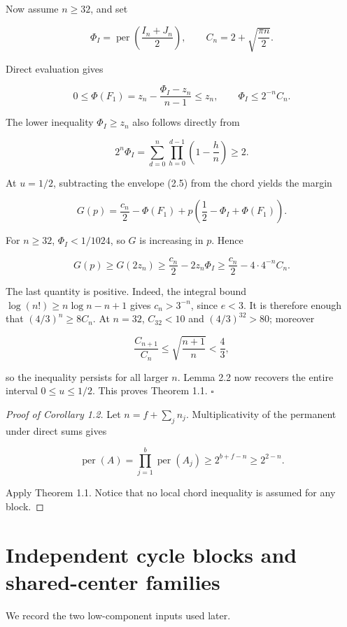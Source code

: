 \documentclass[11pt]{article}
\begin{document}
Now assume $n\ge32$, and set

\[
\Phi_I=\operatorname{per}\left(\frac{I_n+J_n}{2}\right),
\qquad C_n=2+\sqrt{\frac{\pi n}{2}}. \tag{3.1}
\]

Direct evaluation gives

\[
0\le\Phi(F_1)
=z_n-\frac{\Phi_I-z_n}{n-1}\le z_n,
\qquad \Phi_I\le2^{-n}C_n. \tag{3.2}
\]

The lower inequality $\Phi_I\ge z_n$ also follows directly from

\[
2^n\Phi_I=\sum_{d=0}^n\prod_{h=0}^{d-1}\left(1-\frac hn\right)\ge2. \tag{3.3}
\]

At $u=1/2$, subtracting the envelope (2.5) from the chord yields the margin

\[
G(p)=\frac{c_n}{2}-\Phi(F_1)
+p\left(\frac12-\Phi_I+\Phi(F_1)\right). \tag{3.4}
\]

For $n\ge32$, $\Phi_I<1/1024$, so $G$ is increasing in $p$.  Hence

\[
G(p)\ge G(2z_n)
\ge\frac{c_n}{2}-2z_n\Phi_I
\ge\frac{c_n}{2}-4\cdot4^{-n}C_n. \tag{3.5}
\]

The last quantity is positive.  Indeed, the integral bound
$\log(n!)\ge n\log n-n+1$ gives $c_n>3^{-n}$, since $e<3$.  It is therefore
enough that $(4/3)^n\ge8C_n$.  At $n=32$, $C_{32}<10$ and
$(4/3)^{32}>80$; moreover

\[
\frac{C_{n+1}}{C_n}\le\sqrt{\frac{n+1}{n}}<\frac43,
\]

so the inequality persists for all larger $n$.  Lemma 2.2 now recovers the
entire interval $0\le u\le1/2$.  This proves Theorem 1.1.
\hfill$\square$


\begin{proof}[Proof of Corollary 1.2]


Let $n=f+\sum_jn_j$.  Multiplicativity of the permanent under direct sums gives

\[
\operatorname{per}(A)=\prod_{j=1}^b\operatorname{per}(A_j)
\ge2^{b+f-n}\ge2^{2-n}.
\]

Apply Theorem 1.1.  Notice that no local chord inequality is assumed for any block.

\end{proof}


\section{Independent cycle blocks and shared-center families}


We record the two low-component inputs used later.
\end{document}
